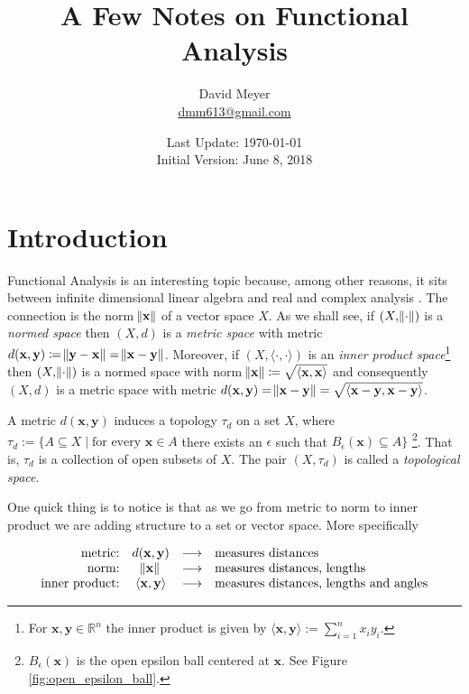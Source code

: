 \documentclass{article}
\title{A Few Notes on Functional Analysis}
\author{David Meyer \\ 
	{\small \vspace{-2.75mm} \href{mailto:dmm613@gmail.com}{dmm613@gmail.com}}}
\date{Last Update: \today \\
	{\small \vspace{1.00mm} Initial Version: June 8, 2018}}
\theoremstyle{definition}
\begin{document}
\maketitle
%
%
%
\section{Introduction}
Functional Analysis is an interesting topic because, among other
reasons, it sits between infinite dimensional linear algebra and
real and complex analysis \cite{fa_mit}. The connection is the
norm $\norm{\mathbf{x}}$ of a vector space $X$. As we shall see,
if $(X,\norm{\cdot})$ is a \emph{normed space} then $(X,d)$ is a
\emph{metric space} with metric $d(\mathbf{x},\mathbf{y})
\coloneqq \norm{\mathbf{y}-\mathbf{x}} =
\norm{\mathbf{x}-\mathbf{y}}$. Moreover, if
$(X,\langle\cdot,\cdot\rangle)$ is an \emph{inner product
space}\footnote{For $\mathbf{x}, \mathbf{y} \in \mathbb{R}^{n}$
the inner product is given by $\langle \mathbf{x}, \mathbf{y}
\rangle := \sum\limits_{i = 1}^{n} x_i y_i$.}  then
$(X,\norm{\cdot})$ is a normed space with norm $\norm{\mathbf{x}}
\coloneqq \sqrt{\langle \mathbf{x},\mathbf{x}\rangle}$ and
consequently $(X,d)$ is a metric space with metric
$d(\mathbf{x},\mathbf{y}) = \norm{\mathbf{x}-\mathbf{y}} =
\sqrt{\langle
\mathbf{x}-\mathbf{y},\mathbf{x}-\mathbf{y}\rangle}$.

\bigskip
\noindent
A metric $d(\mathbf{x},\mathbf{y})$ induces a topology $\tau_d$
on a set $X$, where $\tau_d := \{A \subseteq X \mid \text{for
every $\mathbf{x} \in A$}$ there exists an $\epsilon$ such that
$B_{\epsilon}(\mathbf{x}) \subseteq A\}$ \footnote{
$B_{\epsilon}(\mathbf{x})$ is the open epsilon ball centered at
$\mathbf{x}$. See Figure \ref{fig:open_epsilon_ball}.}. That is,
$\tau_d$ is a collection of open subsets of $X$.  The pair
$(X,\tau_d)$ is called a \emph{topological space}.

\bigskip
\noindent
One quick thing is to notice is that as we go from metric to norm
to inner product we are adding structure to a set or vector
space.  More specifically

\begin{equation*}
\begin{array}{rclll}
\text{metric:}        & d(\mathbf{x},\mathbf{y})                   
		& \longrightarrow & \text{measures distances} \\
\text{norm:}          & \norm{\mathbf{x}}
		& \longrightarrow & \text{measures distances, lengths} \\
\text{inner product:} & \langle\mathbf{x},\mathbf{y}\rangle 
		& \longrightarrow & \text{measures distances, lengths and angles}
\end{array}
\end{equation*}
\end{document}
